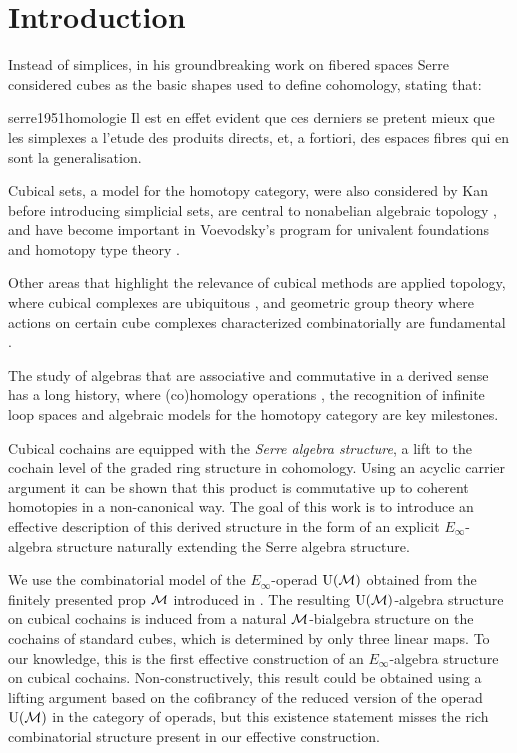 
\section{Introduction} \label{s:introduction}

Instead of simplices, in his groundbreaking work on fibered spaces Serre considered cubes as the basic shapes used to define cohomology, stating that:

\begin{displaycquote}[p.431]{serre1951homologie}
	Il est en effet evident que ces derniers se pretent mieux que les simplexes a l'etude des produits directs, et, a fortiori, des espaces fibres qui en sont la generalisation.
\end{displaycquote}

Cubical sets, a model for the homotopy category, were also considered by Kan \cite{kan1955abstract, kan1956abstract} before introducing simplicial sets, are central to nonabelian algebraic topology \cite{brown2011nonabelian}, and have become important in Voevodsky's program for univalent foundations and homotopy type theory \cite{kapulkin2020straightening, mortberg2017cubical}.

Other areas that highlight the relevance of cubical methods are applied topology, where cubical complexes are ubiquitous \cite{tomasz2004computational}, and geometric group theory where actions on certain cube complexes characterized combinatorially are fundamental \cite{gromov1987hyperbolic, agol2013haken}.

The study of algebras that are associative and commutative in a derived sense has a long history, where (co)homology operations \cite{steenrod1962cohomology, may1970general}, the recognition of infinite loop spaces \cite{boardman1973homotopy, may1972geometry} and algebraic models for the homotopy category \cite{mandell2001padic} are key milestones.

Cubical cochains are equipped with the \textit{Serre algebra structure}, a lift to the cochain level of the graded ring structure in cohomology.
Using an acyclic carrier argument it can be shown that this product is commutative up to coherent homotopies in a non-canonical way.
The goal of this work is to introduce an effective description of this derived structure in the form of an explicit $E_\infty$-algebra structure naturally extending the Serre algebra structure.

We use the combinatorial model of the $E_\infty$-operad ${\operatorname{U}(\mathcal{M})}$ obtained from the finitely presented prop $\mathcal{M}$ introduced in \cite{medina2020prop1}.
The resulting ${\operatorname{U}(\mathcal{M})}$-algebra structure on cubical cochains is induced from a natural $\mathcal{M}$-bialgebra structure on the cochains of standard cubes, which is determined by only three linear maps.
To our knowledge, this is the first effective construction of an $E_\infty$-algebra structure on cubical cochains.
Non-constructively, this result could be obtained using a lifting argument based on the cofibrancy of the reduced version of the operad ${\operatorname{U}(\mathcal{M})}$ in the category of operads, but this existence statement misses the rich combinatorial structure present in our effective construction.

